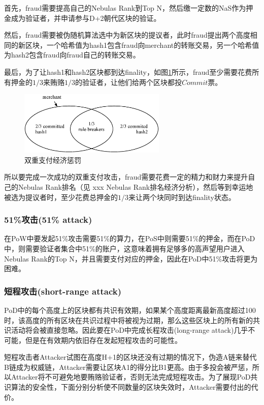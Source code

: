 首先，fraud需要提高自己的Nebulas Rank到Top N，然后缴一定数的NaS作为押金成为验证者，并申请参与D+2朝代区块的验证。

然后，fraud需要被伪随机算法选中为新区块的提议者，此时fraud提出两个高度相同的新区块，一个哈希值为hash1包含fraud向merchant的转账交易，另一个哈希值为hash2包含fraud向fraud自己的转账交易。

最后，为了让hash1和hash2区块都到达finality，如图\ref{fig:double_spend}所示，fraud至少需要花费所有押金的$1/3$来贿赂$1/3$的验证者，让他们给两个区块都投$Commit$票。

\begin{figure}[h]
\centering
\includegraphics[width=7cm]{./figs/overlap}
\caption{双重支付经济惩罚}
\label{fig:double_spend}
\end{figure}

所以要完成一次成功的双重支付攻击，fraud需要花费一定的精力和财力来提升自己的Nebulas Rank排名（见 xxx Nebulas Rank排名经济分析），然后等到幸运地被选为提议者时，至少花费总押金的$1/3$来让两个块同时到达finality状态。

\subsubsection*{51\%攻击(51\% attack)}
\label{PoD:economic:fraud:51attack}

在PoW中要发起51\%攻击需要51\%的算力，在PoS中则需要51\%的押金，而在PoD中，则需要验证者集合中51\%的账户，这意味着拥有足够多的高声望用户进入Nebulas Rank的Top N，并且需要支付对应的押金，因此在PoD中51\%攻击将更为困难。

\subsubsection*{短程攻击(short-range attack)}
\label{PoD:economic:fraud:short_range_attack}

PoD中的每个高度上的区块都有共识有效期，如果某个高度距离最新高度超过100时，该高度的所有区块在共识过程中将被视为过期，那么这些区块上的所有新的共识活动将会被直接忽略。因此要在PoD中完成长程攻击(long-range attack)几乎不可能，但是在有效期内依旧存在发起短程攻击的可能性。

短程攻击者Attacker试图在高度H+1的区块还没有过期的情况下，伪造A链来替代B链成为权威链，Attacker需要让区块A1的得分比B1更高。由于多投会被严惩，所以Attacker将不可避免地要贿赂验证者，否则无法完成短程攻击。为了展现PoD共识算法的安全性，下面分别分析使不同数量的区块失效时，Attacker需要付出的代价。

